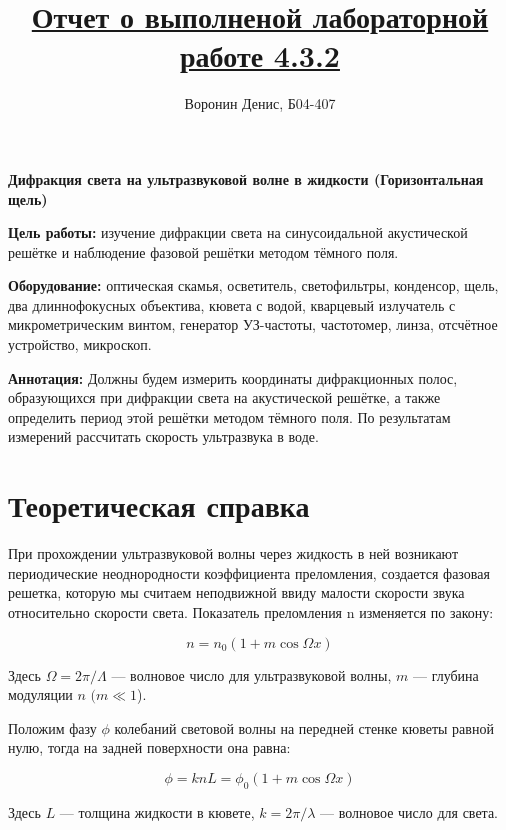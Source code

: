 \documentclass[a4paper]{article}
\title{\underline{Отчет о выполненой лабораторной работе 4.3.2}}
\author{Воронин Денис, Б04-407}
\begin{document}
\maketitle

\begin{center}
\textbf{\Large Дифракция света на ультразвуковой волне
в жидкости (Горизонтальная щель)}
\end{center}

\textbf{Цель работы:}  изучение дифракции света на синусоидальной акустической решётке и наблюдение фазовой решётки методом тёмного поля.\par

\textbf{Оборудование:} оптическая скамья, осветитель, светофильтры, конденсор, щель, два длиннофокусных объектива, кювета с водой, кварцевый излучатель с микрометрическим винтом, генератор УЗ-частоты, частотомер, линза, отсчётное устройство, микроскоп.
\par

\textbf{Аннотация:} Должны будем измерить координаты дифракционных полос, образующихся при дифракции света на акустической решётке, а
также определить период этой решётки методом тёмного поля. По результатам измерений рассчитать скорость ультразвука в воде.

\section{Теоретическая справка}
При прохождении ультразвуковой волны через жидкость в ней возникают периодические неоднородности коэффициента преломления, создается фазовая решетка, которую мы считаем неподвижной ввиду малости скорости звука относительно скорости света. Показатель
	преломления n изменяется по закону:
	
	\begin{equation}\label{}
	n = n_0 (1 + m \cos \Omega x)
	\end{equation}
	
	Здесь $ \Omega = 2 \pi / \Lambda $ --- волновое число для ультразвуковой волны, $ m $ --- глубина модуляции $ n $ $ (m \ll 1 $).
	
	Положим фазу $ \phi $ колебаний световой волны на передней стенке кюветы равной нулю, тогда на задней поверхности она равна:
	
	\begin{equation}\label{}
	\phi  = k n L = \phi_0 (1 + m \cos \Omega x)
	\end{equation}
	
	Здесь $ L $ --- толщина жидкости в кювете, $ k = 2 \pi / \lambda $ --- волновое число для света.
	
\end{document}

